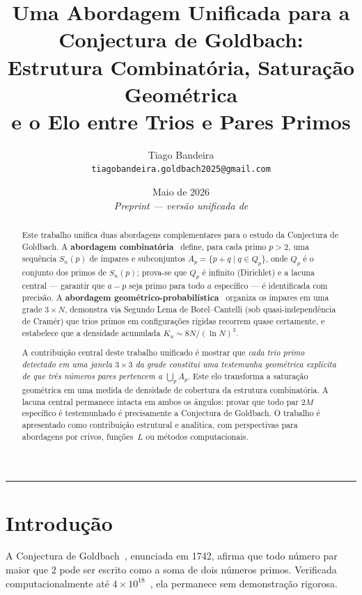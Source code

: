\documentclass[12pt,a4paper]{article}
\title{%
	\textbf{Uma Abordagem Unificada para a Conjectura de Goldbach:}\\[4pt]
	\large Estrutura Combinat\'oria, Satura\c{c}\~ao Geom\'etrica\\
	e o Elo entre Trios e Pares Primos%
}
\author{Tiago Bandeira\\\small \texttt{tiagobandeira.goldbach2025@gmail.com}}
\date{Maio de 2026 \\ \small \emph{Preprint --- vers\~ao unificada de \cite{bandeira2026estrutura,bandeira2026geometrica}}}
\theoremstyle{remark}
\begin{document}
	
	\maketitle
	
	\begin{abstract}
		Este trabalho unifica duas abordagens complementares para o estudo da Conjectura de Goldbach.
		A \textbf{abordagem combinat\'oria}~\cite{bandeira2026estrutura} define, para cada primo $p>2$,
		uma sequ\^encia $S_n(p)$ de \'impares e subconjuntos $A_p = \{p+q \mid q \in Q_p\}$,
		onde $Q_p$ \'e o conjunto dos primos de $S_n(p)$; prova-se que $Q_p$ \'e infinito (Dirichlet)
		e a lacuna central --- garantir que $a-p$ seja primo para todo $a$ espec\'ifico --- \'e
		identificada com precis\~ao.
		A \textbf{abordagem geom\'etrico-probabil\'istica}~\cite{bandeira2026geometrica} organiza os \'impares
		em uma grade $3\times N$, demonstra via Segundo Lema de Borel--Cantelli (sob quasi-independ\^encia
		de Cram\'er) que trios primos em configura\c{c}\~oes r\'igidas recorrem quase certamente,
		e estabelece que a densidade acumulada $K_u \sim 8N/(\ln N)^3$.
		
		A contribui\c{c}\~ao central deste trabalho unificado \'e mostrar que
		\emph{cada trio primo detectado em uma janela $3\times 3$ da grade constitui uma
			testemunha geom\'etrica expl\'icita de que tr\^es n\'umeros pares pertencem a $\bigcup_p A_p$}.
		Este elo transforma a satura\c{c}\~ao geom\'etrica em uma medida de densidade de cobertura
		da estrutura combinat\'oria. A lacuna central permanece intacta em ambos os \^angulos:
		provar que todo par $2M$ espec\'ifico \'e testemunhado \'e precisamente a Conjectura
		de Goldbach. O trabalho \'e apresentado como contribui\c{c}\~ao estrutural e anal\'itica,
		com perspectivas para abordagens por crivos, fun\c{c}\~oes~$L$ ou m\'etodos computacionais.
	\end{abstract}
	
	\setcounter{tocdepth}{2}
	\tableofcontents
	
	\bigskip
	\hrule
	\bigskip
	
	\section{Introdu\c{c}\~ao}
	
	A Conjectura de Goldbach~\cite{goldbach1742}, enunciada em 1742, afirma que todo n\'umero
	par maior que 2 pode ser escrito como a soma de dois n\'umeros primos.
	Verificada computacionalmente at\'e $4\times 10^{18}$~\cite{oliveira2014},
	ela permanece sem demonstra\c{c}\~ao rigorosa.
	
\end{document}

